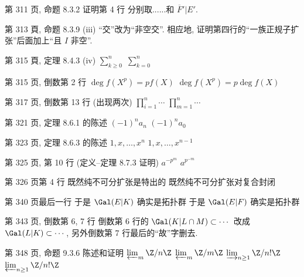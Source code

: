 \documentclass{AJerrata}
\begin{document}
\begin{Errata}
        \item[第 311 页, 命题 8.3.2 证明第 4 行]
        \Corr 分别取......和 $\overline{F}' | E'$.
        
  		\item[第 313 頁, 命题 8.3.9 (iii)]
  		``交''改为``非空交''. 相应地, 证明第四行的``一族正规子扩张''后面加上``且 $I$ 非空''.
        
   		\item[第 315 頁, 定理 8.4.3 (iv)]
        \Orig $\sum_{k \geq 0}^n$
        \Corr $\sum_{k=0}^n$

        \item[第 315 页, 倒数第 2 行]
        \Orig $\deg f(X^p) = pf(X)$
        \Corr $\deg f(X^p) = p \deg f(X)$
        
        \item[第 317 页, 倒数第 13 行]
        (出现两次)\;
        \Orig $\prod_{i=1}^n \cdots$
        \Corr $\prod_{m=1}^n \cdots$
        
        \item[第 321 页, 定理 8.6.1 的陈述]
        \Orig $(-1)^n a_n$
        \Corr $(-1)^n a_0$
        
        \item[第 323 页, 定理 8.6.3 的陈述]
        \Orig $1, x, \ldots, x^n$
        \Corr $1, x, \ldots, x^{n-1}$
        
        \item[第 325 页, 第 10 行 (定义--定理 8.7.3 证明)]
        \Orig $a^{-p^m}$
        \Corr $a^{p^{-m}}$
        
        \item[第 326 页第 4 行]
        \Orig 既然纯不可分扩张是特出的
        \Corr 既然纯不可分扩张对复合封闭
        
        \item[第 340 页最后一行]
        \Orig 于是 $\Gal(E|K)$ 确实是拓扑群
        \Corr 于是 $\Gal(E|F)$ 确实是拓扑群
        
        \item[第 343 页, 倒数第 6, 7 行]
        倒数第 6 行的 $\Gal(K | L \cap M) \subset \cdots$ 改成 $\Gal(L|K) \subset \cdots$, 另外倒数第 7 行最后的``故''字删去.
        
   		\item[第 348 页, 命题 9.3.6 陈述和证明]
        \Orig $\varprojlim_m \Z/n\Z$
        \Corr $\varprojlim_m \Z/m\Z$
        \newline
        \Orig $\varinjlim_{n \geq 1} \Z/n!\Z$
        \Corr $\varprojlim_{n \geq 1} \Z/n!\Z$
        

\end{Errata}
\end{document}
